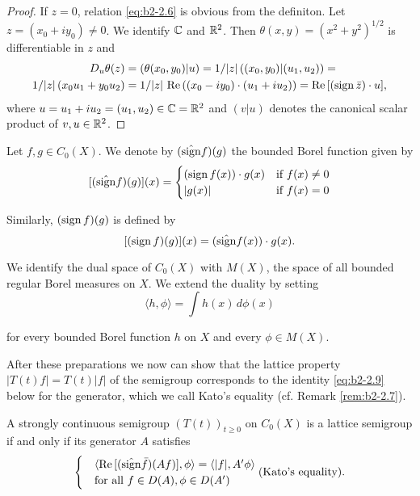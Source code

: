 \begin{proof}
If $z = 0$, relation \eqref{eq:b2-2.6} is obvious from the definiton.
Let $z = (x_{0} + iy_{0}) \neq 0$.
We identify $\mathbb{C}$ and $\mathbb{R}^2$.
Then $\theta(x,y) = (x^2 + y^2)^{1/2}$ is differentiable in $z$ and
\begin{align*}
D_{u}\theta(z) &= (
\theta(x_{0},y_{0})|u) = 1/|z|\, ((x_{0},y_{0})|(u_{1},u_{2})) = \\
1/|z|\, (x_{0}u_{1} + y_{0}u_{2}) &= 1/|z|\, \mathop{}\!\mathrm{Re}\,((x_{0}-iy_{0})\cdot(u_{1}+iu_{2})) = \mathop{}\!\mathrm{Re}\,[(\operatorname{sign} \bar{z})\cdot u],
\end{align*}
where $u = u_{1} + iu_{2} = (u_{1},u_{2}) \in \mathbb{C} = \mathbb{R}^2$ and $(v|u)$ denotes the canonical scalar product of $v,u \in \mathbb{R}^2$.
\end{proof}

Let $f, g \in C_{0}(X)$.
We denote by $(\hat{\operatorname{sign}} f)(g)$ the bounded Borel function given by
\begin{equation}\label{eq:b2-2.7}
[(\hat{\operatorname{sign}} f)(g)](x) = \begin{cases}
    (\operatorname{sign} f(x))\cdot g(x) & \text{if } f(x) \neq 0 \\
    |g(x)| & \text{if } f(x) = 0
\end{cases}
\end{equation}

Similarly, $(\operatorname{sign} f)(g)$ is defined by
\begin{equation}\label{eq:b2-2.8}
[(\operatorname{sign} f)(g)](x) = (\hat{\operatorname{sign}} f(x))\cdot g(x).
\end{equation}

We identify the dual space of $C_{0}(X)$ with $M(X)$, the space of all bounded regular Borel measures on $X$.
We extend the duality by setting
\begin{equation*}
\langle h,\phi \rangle = \int h(x) \, d\phi(x)
\end{equation*}

for every bounded Borel function $h$ on $X$ and every $\phi \in M(X)$.

After these preparations we now can show that the lattice property $|T(t)f| = T(t)|f|$ of the semigroup corresponds to the identity \eqref{eq:b2-2.9} below for the generator, which we call Kato's equality (cf. Remark \ref{rem:b2-2.7}).

\begin{theorem}\label{thm:b2-2.5}
A strongly continuous semigroup $(T(t))_{t \geq 0}$ on $C_{0}(X)$ is a lattice semigroup if and only if its generator $A$ satisfies
\begin{equation}\label{eq:b2-2.9}
 \begin{cases}
&\langle \mathop{}\!\mathrm{Re}\,[(\hat{\operatorname{sign}} \bar{f})(Af)],\phi \rangle = \langle |f|,A'\phi \rangle \\
&\text{for all } f \in D(A), \phi \in D(A') 
\end{cases} \text{(Kato's equality)}.
\end{equation}
\end{theorem}

